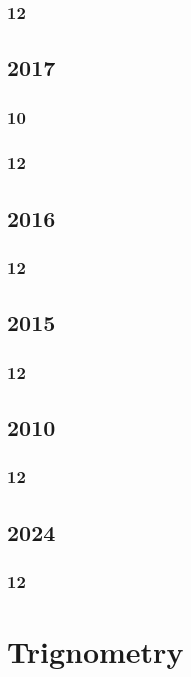 \documentclass[11pt]{book}
\begin{document}
\subsection{12}




\section{2017}
\subsection{10}

\subsection{12}



\section{2016}
\subsection{12}



\section{2015}
\subsection{12}


\section{2010}
\subsection{12}


\section{2024}
\subsection{12}


\chapter{Trignometry}
\end{document}
